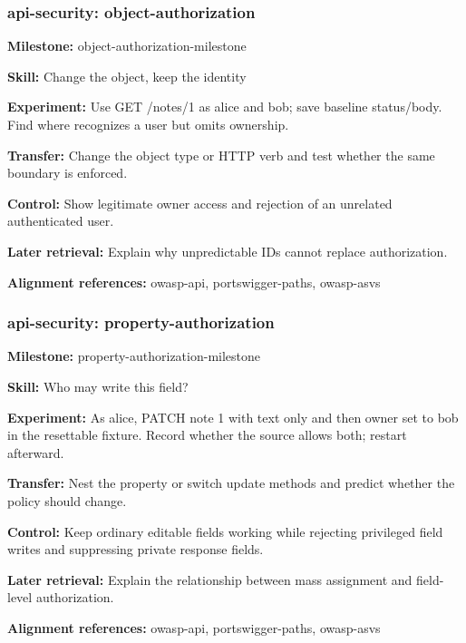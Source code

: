 \subsubsection{api-security: object-authorization}
\noindent\textbf{Milestone:} object-authorization-milestone\par
\noindent\textbf{Skill:} Change the object, keep the identity\par
\noindent\textbf{Experiment:} Use GET /notes/1 as alice and bob; save baseline status/body. Find where  recognizes a user but omits ownership.\par
\noindent\textbf{Transfer:} Change the object type or HTTP verb and test whether the same boundary is enforced.\par
\noindent\textbf{Control:} Show legitimate owner access and rejection of an unrelated authenticated user.\par
\noindent\textbf{Later retrieval:} Explain why unpredictable IDs cannot replace authorization.\par
\noindent\textbf{Alignment references:} owasp-api, portswigger-paths, owasp-asvs\par
\subsubsection{api-security: property-authorization}
\noindent\textbf{Milestone:} property-authorization-milestone\par
\noindent\textbf{Skill:} Who may write this field?\par
\noindent\textbf{Experiment:} As alice, PATCH note 1 with text only and then owner set to bob in the resettable fixture. Record whether the source allows both; restart afterward.\par
\noindent\textbf{Transfer:} Nest the property or switch update methods and predict whether the policy should change.\par
\noindent\textbf{Control:} Keep ordinary editable fields working while rejecting privileged field writes and suppressing private response fields.\par
\noindent\textbf{Later retrieval:} Explain the relationship between mass assignment and field-level authorization.\par
\noindent\textbf{Alignment references:} owasp-api, portswigger-paths, owasp-asvs\par
